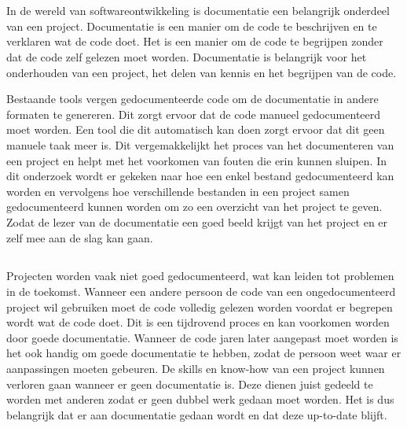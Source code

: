 
\chapter{}%
\label{ch:inleiding}

In de wereld van softwareontwikkeling is documentatie een belangrijk onderdeel van een project.
Documentatie is een manier om de code te beschrijven en te verklaren wat de code doet.
Het is een manier om de code te begrijpen zonder dat de code zelf gelezen moet worden.
Documentatie is belangrijk voor het onderhouden van een project, het delen van kennis en het begrijpen van de code.

Bestaande tools vergen gedocumenteerde code om de documentatie in andere formaten te genereren.
Dit zorgt ervoor dat de code manueel gedocumenteerd moet worden.
Een tool die dit automatisch kan doen zorgt ervoor dat dit geen manuele taak meer is.
Dit vergemakkelijkt het proces van het documenteren van een project en helpt met het voorkomen van fouten die erin kunnen sluipen. 
In dit onderzoek wordt er gekeken naar hoe een enkel bestand gedocumenteerd kan worden en vervolgens hoe verschillende bestanden in een project samen gedocumenteerd kunnen worden om zo een overzicht van het project te geven.
Zodat de lezer van de documentatie een goed beeld krijgt van het project en er zelf mee aan de slag kan gaan.

\section{}%
\label{sec:probleemstelling}

Projecten worden vaak niet goed gedocumenteerd, wat kan leiden tot problemen in de toekomst. Wanneer een andere persoon de code van een ongedocumenteerd project wil gebruiken moet de code volledig gelezen worden voordat er begrepen wordt wat de code doet. 
Dit is een tijdrovend proces en kan voorkomen worden door goede documentatie.
Wanneer de code jaren later aangepast moet worden is het ook handig om goede documentatie te hebben, zodat de persoon weet waar er aanpassingen moeten gebeuren.
De skills en know-how van een project kunnen verloren gaan wanneer er geen documentatie is.
Deze dienen juist gedeeld te worden met anderen zodat er geen dubbel werk gedaan moet worden.
Het is dus belangrijk dat er aan documentatie gedaan wordt en dat deze up-to-date blijft.

